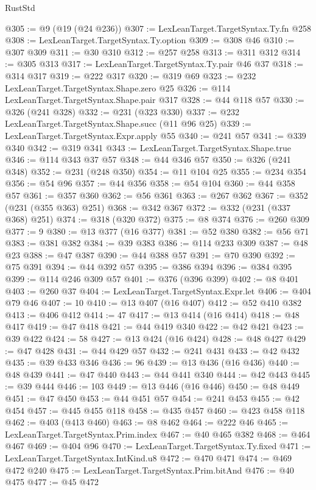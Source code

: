 \begin{lexlean}{RustStd}
\begin{coremodule}
{\begin{coremodule}
{{{{{{{{{{{{{{{@305 := @9 (@19 (@24 @236))
@307 := LexLeanTarget.TargetSyntax.Ty.fn @258
@308 := LexLeanTarget.TargetSyntax.Ty.option
@309 := @308 @46
@310 := @307 @309
@311 := @30 @310
@312 := @257 @258
@313 := @311 @312
@314 := @305 @313
@317 := LexLeanTarget.TargetSyntax.Ty.pair @46 @37
@318 := @314 @317
@319 := @222 @317
@320 := @319 @69
@323 := @232 LexLeanTarget.TargetSyntax.Shape.zero @25
@326 := @114 LexLeanTarget.TargetSyntax.Shape.pair @317
@328 := @44 @118 @57
@330 := @326 (@241 @328)
@332 := @231 (@323 @330)
@337 := @232 LexLeanTarget.TargetSyntax.Shape.succ (@11 @96 @25)
@339 := LexLeanTarget.TargetSyntax.Expr.apply @55
@340 := @241 @57
@341 := @339 @340
@342 := @319 @341
@343 := LexLeanTarget.TargetSyntax.Shape.true
@346 := @114 @343 @37 @57
@348 := @44 @346 @57
@350 := @326 (@241 @348)
@352 := @231 (@248 @350)
@354 := @11 @104 @25
@355 := @234 @354
@356 := @54 @96
@357 := @44 @356
@358 := @54 @104
@360 := @44 @358 @57
@361 := @357 @360
@362 := @56 @361
@363 := @267 @362
@367 := @352 (@231 (@355 @363) @251)
@368 := @342 @367
@372 := @332 (@231 (@337 @368) @251)
@374 := @318 (@320 @372)
@375 := @8 @374
@376 := @260 @309
@377 := 9
@380 := @13 @377 (@16 @377)
@381 := @52 @380
@382 := @56 @71
@383 := @381 @382
@384 := @39 @383
@386 := @114 @233 @309
@387 := @48 @23
@388 := @47 @387
@390 := @44 @388 @57
@391 := @70 @390
@392 := @75 @391
@394 := @44 @392 @57
@395 := @386 @394
@396 := @384 @395
@399 := @114 @246 @309 @57
@401 := @376 (@396 @399)
@402 := @8 @401
@403 := @260 @37
@404 := LexLeanTarget.TargetSyntax.Expr.let
@406 := @404 @79 @46
@407 := 10
@410 := @13 @407 (@16 @407)
@412 := @52 @410 @382
@413 := @406 @412
@414 := 47
@417 := @13 @414 (@16 @414)
@418 := @48 @417
@419 := @47 @418
@421 := @44 @419 @340
@422 := @42 @421
@423 := @39 @422
@424 := 58
@427 := @13 @424 (@16 @424)
@428 := @48 @427
@429 := @47 @428
@431 := @44 @429 @57
@432 := @241 @431
@433 := @42 @432
@435 := @39 @433 @346
@436 := 96
@439 := @13 @436 (@16 @436)
@440 := @48 @439
@441 := @47 @440
@443 := @44 @441 @340
@444 := @42 @443
@445 := @39 @444
@446 := 103
@449 := @13 @446 (@16 @446)
@450 := @48 @449
@451 := @47 @450
@453 := @44 @451 @57
@454 := @241 @453
@455 := @42 @454
@457 := @445 @455 @118
@458 := @435 @457
@460 := @423 @458 @118
@462 := @403 (@413 @460)
@463 := @8 @462
@464 := @222 @46
@465 := LexLeanTarget.TargetSyntax.Prim.index
@467 := @40 @465 @382
@468 := @464 @467
@469 := @404 @96
@470 := LexLeanTarget.TargetSyntax.Ty.fixed
@471 := LexLeanTarget.TargetSyntax.IntKind.u8
@472 := @470 @471
@474 := @469 @472 @240
@475 := LexLeanTarget.TargetSyntax.Prim.bitAnd
@476 := @40 @475
@477 := @45 @472
}}}}}}}}}}}}}}}
\end{coremodule}}
\end{coremodule}
\end{lexlean}

